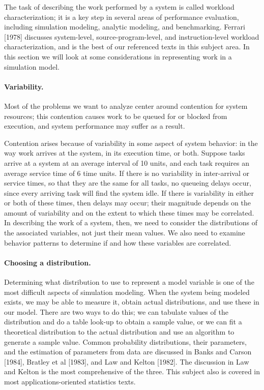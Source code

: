 The task of describing the work performed by a system is called workload
characterization; it is a key step in several areas of performance evaluation,
including simulation modeling, analytic modeling, and benchmarking. Ferrari
[1978] discusses system-level, source-program-level, and instruction-level
workload characterization, and is the best of our referenced texts in this
subject area. In this section we will look at some considerations in
representing work in a simulation model.

\paragraph{Variability.}
Most of the problems we want to analyze center around contention for system
resources; this contention causes work to be queued for or blocked from
execution, and system performance may suffer as a result.

\noindent Contention arises because of variability in some aspect of system behavior:
in the way work arrives at the system, in its execution time, or both. Suppose
tasks arrive at a system at an average interval of 10 units, and each task
requires an average service time of 6 time units. If there is no variability in
inter-arrival or service times, so that they are the same for all tasks, no
queueing delays occur, since every arriving task will find the system idle. If
there is variability in either or both of these times, then delays may occur;
their magnitude depends on the amount of variability and on the extent to which
these times may be correlated. In describing the work of a system, then, we
need to consider the distributions of the associated variables, not just their
mean values. We also need to examine behavior patterns to determine if and how
these variables are correlated.

\paragraph{Choosing a distribution.}
Determining what distribution to use to represent a model variable is one of
the most difficult aspects of simulation modeling. When the system being
modeled exists, we may be able to measure it, obtain actual distributions, and
use these in our model. There are two ways to do this; we can tabulate values
of the distribution and do a table look-up to obtain a sample value, or we can
fit a theoretical distribution to the actual distribution and use an algorithm
to generate a sample value. Common probability distributions, their
parameters, and the estimation of parameters from data are discussed in Banks
and Carson [1984], Bratley et al [1983], and Law and Kelton [1982]. The
discussion in Law and Kelton is the most comprehensive of the three. This
subject also is covered in most applications-oriented statistics texts.

